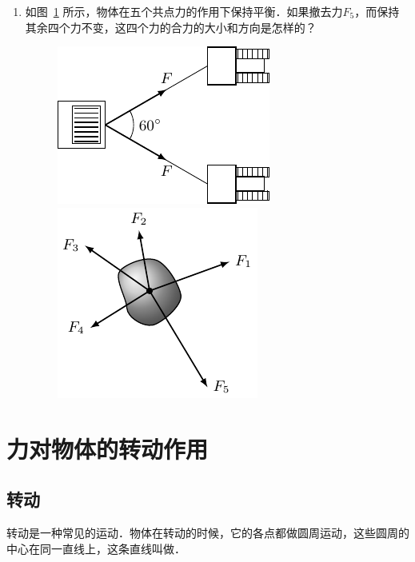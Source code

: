 \begin{enumerate}
    \item 如图~\ref{fig_A_6-5} 所示，物体在五个共点力的作用下保持平衡．如果撤去力$F_5$，而保持其余四个力不变，这四个力的合力的大小和方向是怎样的？
\begin{figure}[htbp]
    \centering
    \begin{minipage}[t]{0.48\textwidth}
        \centering\includegraphics{fig/A/6-4.pdf}
        \caption{}\label{fig_A_6-4}
    \end{minipage}
    \begin{minipage}[t]{0.48\textwidth}
        \centering\includegraphics{fig/A/6-5.pdf}
        \caption{}\label{fig_A_6-5}
    \end{minipage}
\end{figure}


\end{enumerate}

\section{力对物体的转动作用}
\subsection{转动}

转动是一种常见的运动．物体在转动的时候，它的各点都做圆周运动，这些圆周的中心在同一直线上，这条直线叫做．


